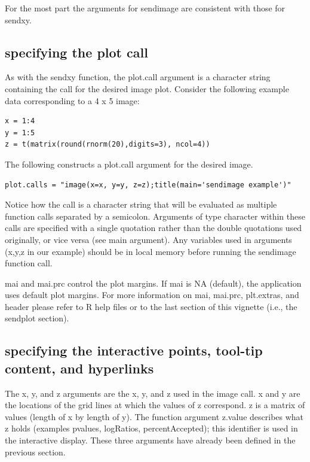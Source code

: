 \documentclass[]{article}
\begin{document}
For the most part the arguments for sendimage are consistent with those for sendxy. 

\subsection{specifying the plot call}
As with the sendxy function, the plot.call argument is a character string containing the call for the desired image plot. Consider the following example data corresponding to a 4 x 5 image:
\begin{verbatim}
x = 1:4
y = 1:5
z = t(matrix(round(rnorm(20),digits=3), ncol=4))
\end{verbatim}



The following constructs a plot.call argument for the desired image. 

\begin{verbatim}
plot.calls = "image(x=x, y=y, z=z);title(main='sendimage example')"
\end{verbatim}


Notice how the call is a character string that will be evaluated as multiple function calls separated by a semicolon.  Arguments of type character within these calls are specified with a single quotation rather than the double quotations used originally, or vice versa (see main argument). Any variables used in arguments (x,y,z in our example) should be in local memory before running the sendimage function call. \newline


\indent mai and mai.prc control the plot margins. If mai is NA (default), the application uses default plot margins. For more information on mai, mai.prc, plt.extras, and header please refer to R help files or to the last section of this vignette (i.e., the sendplot section). \newline


\subsection{specifying the interactive points, tool-tip content, and hyperlinks}

\indent The x, y, and z arguments are the x, y, and z used in the image call. x and y are the locations of the grid lines at which the values of z correspond. z is a matrix of values (length of x  by length of y). The function argument z.value describes what z holds (examples pvalues, logRatios, percentAccepted); this identifier is used in the interactive display. These three arguments have already been defined in the previous section. \\
\end{document}
